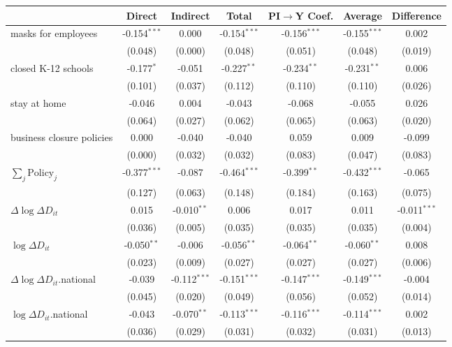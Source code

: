 
\begin{tabular}{lccccc|>{}c}
\toprule
  & Direct & Indirect & Total & PI$\to$Y Coef. & Average & Difference\\
\midrule
masks for employees & -0.154$^{***}$ & 0.000 & -0.154$^{***}$ & -0.156$^{***}$ & -0.155$^{***}$ & 0.002\\
 & (0.048) & (0.000) & (0.048) & (0.051) & (0.048) & (0.019)\\
closed K-12 schools & -0.177$^{*}$ & -0.051 & -0.227$^{**}$ & -0.234$^{**}$ & -0.231$^{**}$ & 0.006\\
 & (0.101) & (0.037) & (0.112) & (0.110) & (0.110) & (0.026)\\
stay at home & -0.046 & 0.004 & -0.043 & -0.068 & -0.055 & 0.026\\
 & (0.064) & (0.027) & (0.062) & (0.065) & (0.063) & (0.020)\\
business closure policies & 0.000 & -0.040 & -0.040 & 0.059 & 0.009 & -0.099\\
 & (0.000) & (0.032) & (0.032) & (0.083) & (0.047) & (0.083)\\
$\sum_j \mathrm{Policy}_j$ & -0.377$^{***}$ & -0.087 & -0.464$^{***}$ & -0.399$^{**}$ & -0.432$^{***}$ & -0.065\\
 & (0.127) & (0.063) & (0.148) & (0.184) & (0.163) & (0.075)\\
$\Delta \log \Delta D_{it}$ & 0.015 & -0.010$^{**}$ & 0.006 & 0.017 & 0.011 & -0.011$^{***}$\\
 & (0.036) & (0.005) & (0.035) & (0.035) & (0.035) & (0.004)\\
$\log \Delta D_{it}$ & -0.050$^{**}$ & -0.006 & -0.056$^{**}$ & -0.064$^{**}$ & -0.060$^{**}$ & 0.008\\
 & (0.023) & (0.009) & (0.027) & (0.027) & (0.027) & (0.006)\\
$\Delta \log \Delta D_{it}$.national & -0.039 & -0.112$^{***}$ & -0.151$^{***}$ & -0.147$^{***}$ & -0.149$^{***}$ & -0.004\\
 & (0.045) & (0.020) & (0.049) & (0.056) & (0.052) & (0.014)\\
$\log \Delta D_{it}$.national & -0.043 & -0.070$^{**}$ & -0.113$^{***}$ & -0.116$^{***}$ & -0.114$^{***}$ & 0.002\\
 & (0.036) & (0.029) & (0.031) & (0.032) & (0.031) & (0.013)\\
\bottomrule
\end{tabular}